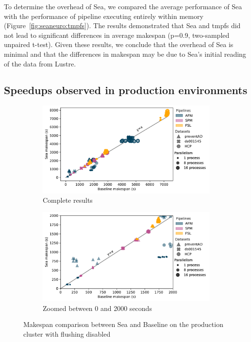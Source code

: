 \documentclass[fleqn,10pt]{wlscirep}
\begin{document}
To determine the overhead of Sea, we compared the average performance of Sea with
the performance of pipeline executing entirely within memory
(Figure~\ref{fig:seaneuro:tmpfs}). The results demonstrated that Sea and tmpfs
did not lead to significant differences in average makespan (p=0.9, two-sampled unpaired t-test). Given these results, we conclude that the
overhead of Sea is minimal and that the differences in makespan may be
due to Sea's initial reading of the data from Lustre.


\subsection{Speedups observed in production environments}

\begin{figure}

\begin{subfigure}{0.5\textwidth}
    \centering
    \captionsetup{width=.85\linewidth}
    \includegraphics[width=\columnwidth]{figures/beluga_withoutflush_nozoom.pdf}%
    \caption{Complete results}\label{fig:seaneuro:belugafull}
\end{subfigure}
\begin{subfigure}{0.5\textwidth}
    \centering
    \captionsetup{width=.85\linewidth}
    \includegraphics[width=\linewidth]{figures/beluga_withoutflush_zoom.pdf}
    \caption{Zoomed between 0 and 2000 seconds}\label{fig:seaneuro:belugazoom}
\end{subfigure}
\caption{Makespan comparison between Sea and Baseline on the production cluster with flushing disabled}
\label{fig:seaneuro:beluga-noflush}
\end{figure}
\end{document}
